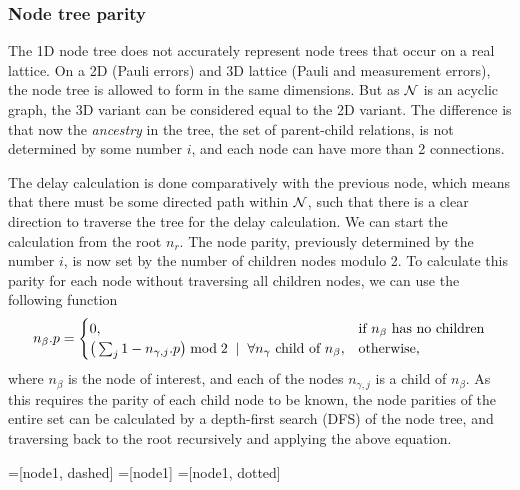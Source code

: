 \subsubsection{Node tree parity}

The 1D node tree does not accurately represent node trees that occur on a real lattice. On a 2D (Pauli errors) and 3D lattice (Pauli and measurement errors), the node tree is allowed to form in the same dimensions. But as $\mathcal{N}$ is an acyclic graph, the 3D variant can be considered equal to the 2D variant. The difference is that now the \emph{ancestry} in the tree, the set of parent-child relations, is not determined by some number $i$, and each node can have more than 2 connections.

The delay calculation is done comparatively with the previous node, which means that there must be some directed path within $\mathcal{N}$, such that there is a clear direction to traverse the tree for the delay calculation. We can start the calculation from the root $n_r$. The node parity, previously determined by the number $i$, is now set by the number of children nodes modulo 2. To calculate this parity for each node without traversing all children nodes, we can use the following function
\begin{equation}\label{eq:nodeparitypart}
  n_\beta.p =
  \begin{cases}
    0, & \mbox{if $n_\beta$ has no children}  \\
    \big( \sum_{j} 1-n_{\gamma,j}.p \big ) \bmod 2 \hspace{.2cm} | \hspace{.2cm} \forall n_\gamma \mbox{ child of } n_\beta, & \mbox{otherwise},
  \end{cases}
\end{equation}
where $n_\beta$ is the node of interest, and each of the nodes $n_{\gamma,j}$ is a child of $n_\beta$. As this requires the parity of each child node to be known, the node parities of the entire set can be calculated by a depth-first search (DFS) of the node tree, and traversing back to the root recursively and applying the above equation.

=[node1, dashed]
=[node1]
=[node1, dotted]


